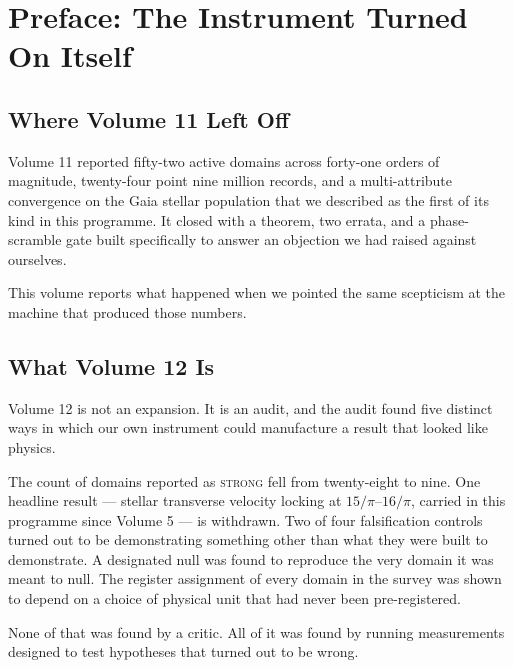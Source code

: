 \documentclass[11pt, letterpaper, openany]{book}
\begin{document}
\tableofcontents
\clearpage

\chapter*{Preface: The Instrument Turned On Itself}

\section*{Where Volume 11 Left Off}

Volume 11 reported fifty-two active domains across forty-one orders of magnitude, twenty-four
point nine million records, and a multi-attribute convergence on the Gaia stellar population
that we described as the first of its kind in this programme. It closed with a theorem, two
errata, and a phase-scramble gate built specifically to answer an objection we had raised
against ourselves.

This volume reports what happened when we pointed the same scepticism at the machine that
produced those numbers.

\section*{What Volume 12 Is}

Volume 12 is not an expansion. It is an audit, and the audit found five distinct ways in which
our own instrument could manufacture a result that looked like physics.

The count of domains reported as \textsc{strong} fell from twenty-eight to nine. One headline
result --- stellar transverse velocity locking at $15/\pi$--$16/\pi$, carried in this programme
since Volume 5 --- is withdrawn. Two of four falsification controls turned out to be
demonstrating something other than what they were built to demonstrate. A designated null was
found to reproduce the very domain it was meant to null. The register assignment of every
domain in the survey was shown to depend on a choice of physical unit that had never been
pre-registered.

None of that was found by a critic. All of it was found by running measurements designed to
test hypotheses that turned out to be wrong.
\end{document}
